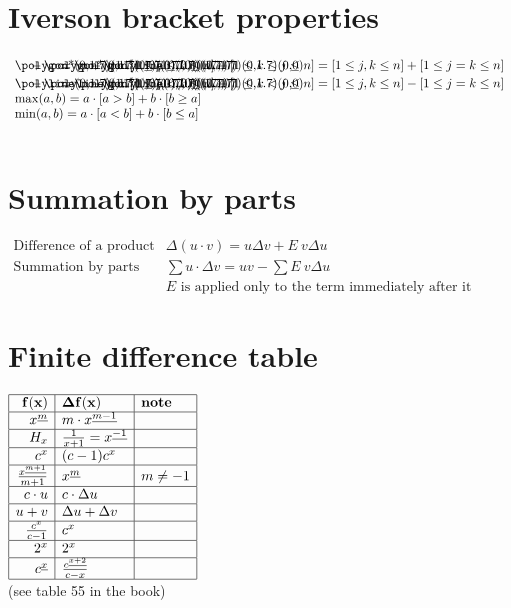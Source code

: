 \documentclass[10pt]{article}
\begin{document}
\begin{multicols}{3}
\vfill\null
\columnbreak

\section{Iverson bracket properties}

{
$
\begin{array}{l}
\URF + \LRF = \SBL + \DIAG \quad [ 1\leq j\leq k\leq n ] + [ 1\leq k\leq j \leq n ] = [ 1\leq j,k \leq n ] + [ 1\leq j=k \leq n ]\\\relax
\UR + \LR = \SBL - \DIAG \quad [ 1\leq j < k \leq n ] + [ 1\leq k < j \leq n ] = [ 1\leq j,k\leq n ] - [ 1\leq j=k\leq n ]\\\relax
\max(a,b)=a\cdot[a>b]+b\cdot[b\geq a]\\\relax
\min(a,b)=a\cdot[a<b]+b\cdot[b\leq a]\\\relax
\end{array}
$
}

\section{Summation by parts}
{\everymath{\displaystyle}
$
\begin{array}{ll}
\text{Difference of a product} & \Delta(u\cdot v) = u\Delta v + E\ v\Delta u\\
\text{Summation by parts}      & \sum u\cdot \Delta v = u v - \sum E\ v\Delta u\\
& E \text{ is applied only to the term immediately after it} 
\end{array}
$
}

\section{Finite difference table}
{
\everymath{\displaystyle}
\bgroup
\def\arraystretch{1.6}
$
\begin{array}{|r|l|l|}
\hline
\mathbf{f(x)} & \mathbf{\Delta f(x)} & \textbf{note}\\
\hline
x^{\underline{m}} & m\cdot x^{\underline{m-1}} & \\ 
\hline
H_x & \frac{1}{x+1} = x^{\underline{-1}}& \\ 
\hline
c^x & (c-1)c^x & \\ 
\hline
\frac{x^{\underline{m+1}}}{m+1} & x^{\underline{m}} & m \neq -1 \\ 
\hline
c \cdot u & c\cdot \Delta u & \\ 
\hline
u + v & \Delta u + \Delta v & \\ 
\hline
\frac{c^x}{c-1} & c^x & \\
\hline
2^x & 2^x & \\
\hline
{c}^{\underline{x}} & \frac{{c}^{\underline{x+2}}}{c-x} & \\
\hline
\end{array}
$
\egroup
}
\\
(see table 55 in the book)

\end{multicols}
\end{document}

